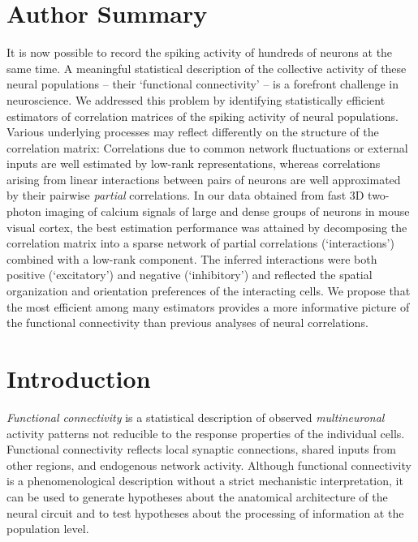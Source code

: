\section*{Author Summary}
It is now possible to record the spiking activity of hundreds of neurons at the same time.  A meaningful statistical description of the collective activity of these neural populations -- their `functional connectivity' -- is a forefront challenge in neuroscience.  We addressed this problem by identifying statistically efficient estimators of correlation matrices of the spiking activity of neural populations.  Various underlying processes may reflect differently on the structure of the correlation matrix:  Correlations due to common network fluctuations or external inputs are well estimated by low-rank representations, whereas correlations arising from linear interactions between pairs of neurons are well approximated by their pairwise \emph{partial} correlations.  In our data obtained from fast 3D two-photon imaging of calcium signals of large and dense groups of neurons in mouse visual cortex, the best estimation performance was attained by decomposing the correlation matrix into a sparse network of partial correlations (`interactions') combined with a low-rank component. The inferred interactions were both positive (`excitatory') and negative (`inhibitory') and reflected the spatial organization and orientation preferences of the interacting cells.  We propose that  the most efficient among many estimators provides a more informative picture of the functional connectivity than previous analyses of neural correlations.


\section*{Introduction}
\emph{Functional connectivity} is a statistical description of observed \emph{multineuronal} activity patterns not reducible to the response properties of the individual cells. Functional connectivity reflects local synaptic connections, shared inputs from other regions, and endogenous network activity. Although functional connectivity is a phenomenological description without a strict mechanistic interpretation, it can be used to generate hypotheses about the anatomical architecture of the neural circuit and to test hypotheses about the processing of information at the population level.

